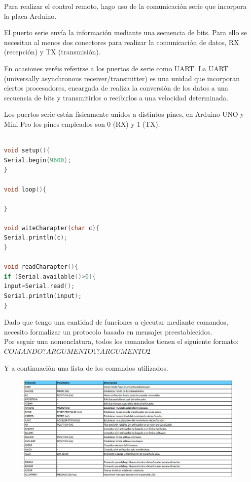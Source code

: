 Para realizar el control remoto, hago uso de la comunicación serie que incorpora la placa Arduino.


El puerto serie envía la información mediante una secuencia de bits. Para ello se necesitan al menos dos conectores para realizar la comunicación de datos, RX (recepción) y TX (transmisión). 

En ocasiones veréis referirse a los puertos de serie como UART. La UART (universally asynchronous receiver/transmitter) es una unidad que incorporan ciertos procesadores, encargada de realiza la conversión de los datos a una secuencia de bits y transmitirlos o recibirlos a una velocidad determinada.

Los puertos serie están físicamente unidos a distintos pines, en Arduino UNO y Mini Pro los pines empleados son 0 (RX) y 1 (TX).


\begin{lstlisting}[language=C, caption={Ejemplo lectura y escritura puerto serie},label={lst:write_read_serial_port_sample}]

void setup(){
Serial.begin(9600);
}

void loop(){

}

void witeCharapter(char c){
Serial.println(c);
}

void readCharapter(){
if (Serial.available()>0){
input=Serial.read();
Serial.println(input);
}


\end{lstlisting}


Dado que tengo una cantidad de funciones a ejecutar mediante comandos, necesito formalizar un protocolo basado en mensajes preestablecidos. \\
Por seguir una nomenclatura, todos los comandos tienen el siguiente formato: \\


$ COMANDO?ARGUMENTO1?ARGUMENTO2  $

Y a continuación una lista de los comandos utilizados.


\begin{figure}[h]
	\centering
	\includegraphics[width=1.1\linewidth]{../images/comando_ardufocuser}
	\caption{}
	\label{fig:comando_ardufocuser}
\end{figure}

